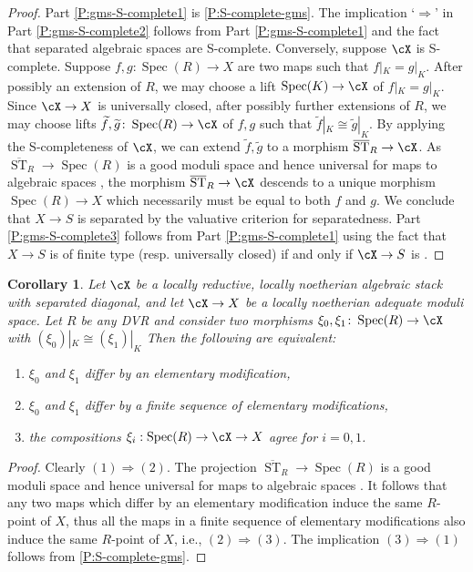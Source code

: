 \documentclass[a4paper]{amsart}
\numberwithin{equation}{section}
\theoremstyle{plain}
\newtheorem{cor}[thm]{Corollary}
\theoremstyle{definition}
\DeclareMathOperator{\Spec}{Spec}
\DeclareMathOperator{\ST}{ST}
\newcommand{\co}{\colon}
\def\oST{\overline{\ST}}
\begin{document}
\begin{proof} Part \eqref{P:gms-S-complete1} is \eqref{P:S-complete-gms}.
The implication `$\Rightarrow$' in Part \eqref{P:gms-S-complete2} follows from Part \eqref{P:gms-S-complete1} and the fact that separated algebraic spaces are {\textsf{S}}-complete.  Conversely, suppose $\cX$ is {\textsf{S}}-complete.  Suppose $f, g \co \Spec(R) \to X$ are two maps such that $f|_K = g|_K$.  After possibly an %
extension of $R$, we may choose a lift  $\Spec(K) \to \cX$ of $f|_K=g|_K$.  Since $\cX \to X$ is universally closed, after possibly further extensions of $R$, we may choose lifts $\widetilde{f}, \widetilde{g} \co \Spec(R) \to \cX$ of $f, g$ such that $\widetilde{f}|_K \cong \widetilde{g}|_K$.  By applying the {\textsf{S}}-completeness of $\cX$, we can extend $\widetilde{f}, \widetilde{g}$ to a morphism $\oST_R \to \cX$.  As $\oST_R \to \Spec(R)$ is a good moduli space and hence universal for maps to algebraic spaces \cite[Thm.~6.6]{alper-good}, the morphism $\oST_R \to \cX$ descends to a unique morphism $\Spec(R) \to X$ which necessarily must be equal to both $f$ and $g$.  We conclude that $X \to S$ is separated by the valuative criterion for separatedness.   Part  \eqref{P:gms-S-complete3} follows from Part \eqref{P:gms-S-complete1} using the fact that $X \to S$ is of finite type (resp. universally closed) if and only if $\cX \to S$ is \cite[Thms.~5.3.1 and 6.3.3]{alper-adequate}.
\end{proof}

\begin{cor} \label{C:modifications_GMS}
Let $\cX$ be a locally reductive, locally noetherian algebraic stack with separated diagonal, and let $\cX \to X$ be a locally noetherian adequate moduli space. Let $R$ be any DVR and consider two morphisms $\xi_0,\xi_1 \co \Spec(R) \to \cX$ with $(\xi_0)|_K \cong (\xi_1)|_K$  Then the following are equivalent:
\begin{enumerate}
\item $\xi_0$ and $\xi_1$ differ by an elementary modification,
\item $\xi_0$ and $\xi_1$ differ by a finite sequence of elementary modifications,
\item the compositions $\xi_i : \Spec(R) \to \cX \to X$ agree for $i=0,1$.
\end{enumerate}
\end{cor}



\begin{proof}
Clearly $(1) \Rightarrow (2)$. The projection $\oST_R \to \Spec(R)$ is a good moduli space and hence universal for maps to algebraic spaces \cite[Thm.~6.6]{alper-good}. It follows that any two maps which differ by an elementary modification induce the same $R$-point of $X$, {thus all the maps in a finite sequence of elementary modifications also induce the same $R$-point of $X$, i.e.,} $(2) \Rightarrow (3)$.  The implication $(3) \Rightarrow (1)$ follows from \eqref{P:S-complete-gms}.
\end{proof}
\end{document}
